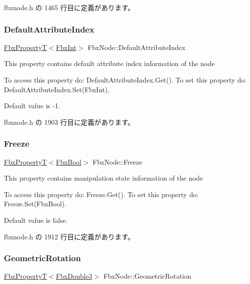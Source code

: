  fbxnode.\+h の 1465 行目に定義があります。

\mbox{\label{class_fbx_node_aeef58595094078471017626db0fb1f00}} 
\subsubsection{\texorpdfstring{Default\+Attribute\+Index}{DefaultAttributeIndex}}
{\footnotesize\ttfamily \hyperlink{class_fbx_property_t}{Fbx\+PropertyT}$<$\hyperlink{fbxtypes_8h_a088fa96de3b0b3ea69f0f6afef525dfb}{Fbx\+Int}$>$ Fbx\+Node\+::\+Default\+Attribute\+Index}

This property contains default attribute index information of the node

To access this property do\+: Default\+Attribute\+Index.\+Get(). To set this property do\+: Default\+Attribute\+Index.\+Set(\+Fbx\+Int).

Default value is -\/1. 

 fbxnode.\+h の 1903 行目に定義があります。

\mbox{\label{class_fbx_node_a473f1f463eefd348b159ff832d6681a1}} 
\subsubsection{\texorpdfstring{Freeze}{Freeze}}
{\footnotesize\ttfamily \hyperlink{class_fbx_property_t}{Fbx\+PropertyT}$<$\hyperlink{fbxtypes_8h_a92e0562b2fe33e76a242f498b362262e}{Fbx\+Bool}$>$ Fbx\+Node\+::\+Freeze}

This property contains manipulation state information of the node

To access this property do\+: Freeze.\+Get(). To set this property do\+: Freeze.\+Set(\+Fbx\+Bool).

Default value is false. 

 fbxnode.\+h の 1912 行目に定義があります。

\mbox{\label{class_fbx_node_aa4c18688d7b0590c405af9198e27a678}} 
\subsubsection{\texorpdfstring{Geometric\+Rotation}{GeometricRotation}}
{\footnotesize\ttfamily \hyperlink{class_fbx_property_t}{Fbx\+PropertyT}$<$\hyperlink{fbxtypes_8h_ae0a96f14cde566774c7553aa7523b7a7}{Fbx\+Double3}$>$ Fbx\+Node\+::\+Geometric\+Rotation}

